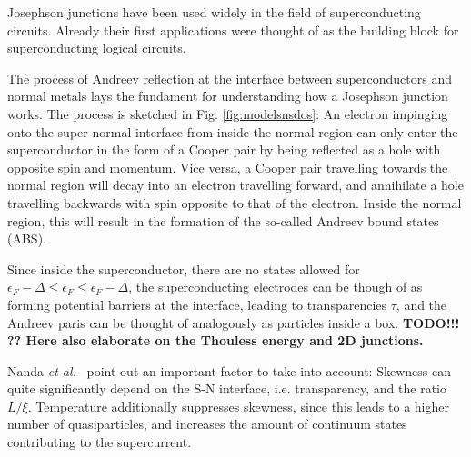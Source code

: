 Josephson junctions have been used widely in the field of superconducting circuits.
%
Already their first applications were thought of as the building block for superconducting logical circuits.

The process of Andreev reflection at the interface between superconductors and normal metals lays the fundament for understanding how a Josephson junction works.
%
The process is sketched in Fig. \ref{fig:modelsnsdos}:
%
An electron impinging onto the super-normal interface from inside the normal region can only enter the superconductor in the form of a Cooper pair by being reflected as a hole with opposite spin and momentum.
%
Vice versa, a Cooper pair travelling towards the normal region will decay into an electron travelling forward, and annihilate a hole travelling backwards with spin opposite to that of the electron.
%
Inside the normal region, this will result in the formation of the so-called Andreev bound states (ABS).

Since inside the superconductor, there are no states allowed for $\epsilon_F - \Delta \leq \epsilon_F \leq \epsilon_F - \Delta$, the superconducting electrodes can be though of as forming potential barriers at the interface, leading to transparencies $\tau$, and the Andreev paris can be thought of analogously as particles inside a box.
%
\textbf{TODO!!! ?? Here also elaborate on the Thouless energy and 2D junctions.}


Nanda \textit{et al.}~\cite{nandaCurrentPhaseRelationBallistic2017} point out an important factor to take into account:
%
Skewness can quite significantly depend on the S-N interface, i.e. transparency, and the ratio $L/\xi$.
%
Temperature additionally suppresses skewness, since this leads to a higher number of quasiparticles, and increases the amount of continuum states contributing to the supercurrent.

